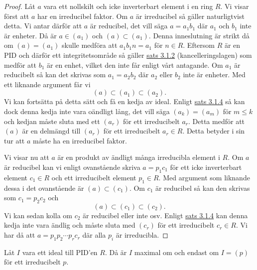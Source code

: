 \documentclass{article}
\theoremstyle{definition}
\begin{document}
\begin{proof}
  Låt $a$ vara ett nollskilt och icke inverterbart element i en ring $R$. Vi visar först att $a$ har en irreducibel faktor. 
  Om $a$ är irreducibel så gäller naturligtvist detta. Vi antar därför att $a$ är reducibel, det vill säga $a = a_1b_1$
  där $a_1$ och $b_1$ inte är enheter. Då är $a \in (a_1)$ och $(a) \subset (a_1)$. Denna inneslutning är strikt då 
  om $(a) = (a_1)$ skulle medföra att $a_1b_1n = a_1$ för $n \in R$. Eftersom $R$ är en PID och därför ett integritetsområde
  så gäller \hyperlink{kancelleringslagen}{sats 3.1.2} (kancelleringslagen) 
  som medför att $b_1$ är en enhet, vilket den inte får enligt vårt antagande. 
  Om $a_1$ är reducibelt så kan det skrivas som $a_1 = a_2b_2$ där $a_2$ eller $b_2$ inte är enheter. Med ett liknande argument får vi 
  \[(a) \subset (a_1) \subset (a_2).\]
  Vi kan fortsätta på detta sätt och få en kedja av ideal. Enligt \hyperlink{pidnoe}{sats 3.1.4} så kan dock denna kedja inte vara oändligt lång, 
  det vill säga $(a_k) = (a_m)$ för $m \leq k$ och kedjan måste sluta med ett $(a_r)$ för ett irreducibelt $a_r$.
  Detta medför att $(a)$ är en delmängd till $(a_r)$ för ett irreducibelt $a_r \in R$. 
  Detta betyder i sin tur att $a$ måste ha en irreducibel faktor.
  
  Vi visar nu att $a$ är en produkt av ändligt många irreducibla element i $R$. Om $a$ är reducibel kan vi enligt ovanstående 
  skriva $a = p_1c_1$ för ett icke inverterbart element $c_1 \in R$ och ett irreducibelt element $p_1 \in R$. Med argument som 
  liknande dessa i det ovanstående är $(a) \subset (c_1)$. Om $c_1$ är reducibel så kan den skrivas som $c_1 = p_2c_2$ och 
  \[(a) \subset (c_1) \subset (c_2).\]
  Vi kan sedan kolla om $c_2$ är reducibel eller inte osv. Enligt \hyperlink{pidnoe}{sats 3.1.4} kan denna kedja inte vara ändlig och 
  måste sluta med $(c_r)$ för ett irreducibelt $c_r \in R$. Vi har då att $a = p_1p_2 \cdots p_rc_r$ där alla $p_i$ är irreducibla.
\end{proof}

\hypertarget{max}{}
\begin{mylemma}{}{}
  Låt $I$ vara ett ideal till PID'en $R$. Då är $I$ maximal om och endast om $I = (p)$ för ett irreducibelt $p$.
\end{mylemma}
\end{document}
